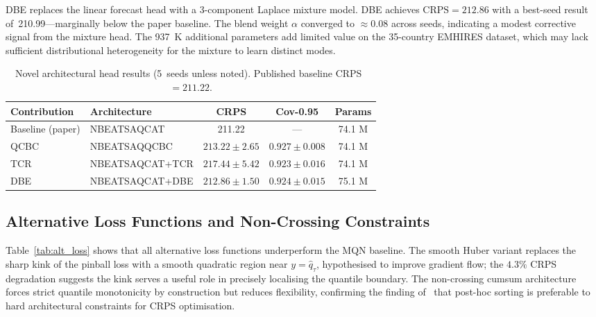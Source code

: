 DBE replaces the linear forecast head with a 3-component Laplace mixture
model.  DBE achieves $\mathrm{CRPS} = 212.86$ with a best-seed result
of~210.99---marginally below the paper baseline.
The blend weight $\alpha$ converged to $\approx 0.08$ across seeds,
indicating a modest corrective signal from the mixture head.
The 937~K additional parameters add limited value on the 35-country
EMHIRES dataset, which may lack sufficient distributional heterogeneity
for the mixture to learn distinct modes.

\begin{table}[H]
\centering
\caption{Novel architectural head results (5~seeds unless noted).
  Published baseline CRPS~$= 211.22$.}
\label{tab:novel}
\begin{tabular}{llccc}
\toprule
\textbf{Contribution} & \textbf{Architecture} & \textbf{CRPS} &
\textbf{Cov-0.95} & \textbf{Params} \\
\midrule
Baseline (paper)  & NBEATSAQCAT      & 211.22             & ---             & 74.1 M \\
QCBC              & NBEATSAQQCBC     & $213.22\pm2.65$    & $0.927\pm0.008$ & 74.1 M \\
TCR               & NBEATSAQCAT+TCR  & $217.44\pm5.42$    & $0.923\pm0.016$ & 74.1 M \\
DBE               & NBEATSAQCAT+DBE  & $212.86\pm1.50$    & $0.924\pm0.015$ & 75.1 M \\
\bottomrule
\end{tabular}
\end{table}

\subsection{Alternative Loss Functions and Non-Crossing Constraints}
\label{subsec:alt_loss_results}

Table~\ref{tab:alt_loss} shows that all alternative loss functions
underperform the MQN baseline.
The smooth Huber variant replaces the sharp kink of the pinball loss
with a smooth quadratic region near
$y = \hat{q}_\tau$, hypothesised to improve gradient flow; the $4.3\%$
CRPS degradation suggests the kink serves a useful role in precisely
localising the quantile boundary.
The non-crossing cumsum architecture forces strict quantile monotonicity
by construction but reduces flexibility, confirming the finding
of~\cite{chernozhukov2010} that post-hoc sorting is preferable to hard
architectural constraints for CRPS optimisation.

